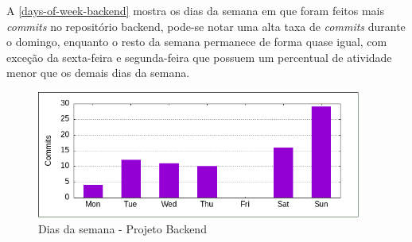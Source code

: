A \autoref{days-of-week-backend} mostra os dias da semana em que foram feitos mais \emph{commits} no repositório \gls{backend}, pode-se notar uma alta taxa de \emph{commits} durante o domingo, enquanto o resto da semana permanece de forma quase igual, com exceção da sexta-feira e segunda-feira que possuem um percentual de atividade menor que os demais dias da semana.
\begin{figure}[H]
	\centering
	\caption{\label{days-of-week-backend}Dias da semana - Projeto Backend}
	\includegraphics[width=0.95\textwidth]{../imagens/stats/days-of-week-backend.png}
\end{figure}